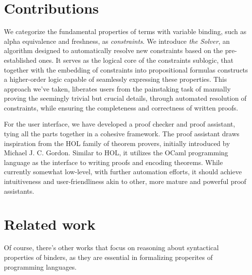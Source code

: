 \documentclass[english, mgr]{iithesis}
\begin{document}
\section{Contributions}
We categorize the fundamental properties of terms with variable binding,
such as alpha equivalence and freshness, as \textit{constraints}.
We introduce \textit{the Solver}, an algorithm designed to automatically
resolve new constraints based on the pre-established ones.
It serves as the logical core of the constraints sublogic,
that together with the embedding of constraints into propositional formulas
constructs a higher-order logic capable of seamlessly expressing these properties.
This approach we've taken, liberates users from the painstaking task of manually proving the seemingly trivial but crucial details, through automated resolution of constraints,
while ensuring the completeness and correctness of written proofs.

For the user interface, we have developed a proof checker and proof assistant,
tying all the parts together in a cohesive framework.
The proof assistant draws inspiration from the HOL family of theorem provers,
initially introduced by Michael J. C. Gordon\cite{HOL}.
Similar to HOL, it utilizes the OCaml programming language as the
interface to writing proofs and encoding theorems.
While currently somewhat low-level, with further automation efforts,
it should achieve intuitiveness and user-friendliness akin to other,
more mature and powerful proof assistants.

\section{Related work}
Of course, there's other works that focus on reasoning about
syntactical properties of binders, as they are essential
in formalizing properites of programming languages.
\end{document}
